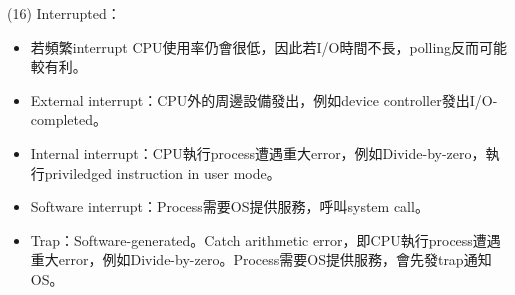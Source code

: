 \begin{theorem}{(16)} Interrupted：\begin{itemize}
        \item 若頻繁interrupt CPU使用率仍會很低，因此若I/O時間不長，polling反而可能較有利。
        \item External interrupt：CPU外的周邊設備發出，例如device controller發出I/O-completed。
        \item Internal interrupt：CPU執行process遭遇重大error，例如Divide-by-zero，執行priviledged instruction in user mode。
        \item Software interrupt：Process需要OS提供服務，呼叫system call。
        \item Trap：Software-generated。Catch arithmetic error，即CPU執行process遭遇重大error，例如Divide-by-zero。Process需要OS提供服務，會先發trap通知OS。
    \end{itemize}
\end{theorem}
